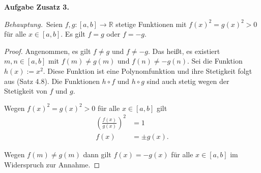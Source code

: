 \documentclass[12pt]{extarticle}
\newcommand{\beh}{\textit{Behauptung.}\ }
\newcommand{\aufgn}[1]{\textbf{Aufgabe #1.}}
\newcommand{\mg}[1]{\mathbb{#1}}
\begin{document}
\aufgn{Zusatz 3}

\beh Seien \(f, g \colon \left[a, b\right] \to \mg{R}\)
 stetige Funktionen mit \(f(x)^2=g(x)^2 > 0\) für alle
\(x \in \left[a, b\right]\).  Es gilt \(f = g\) oder \(f = -g\).

\begin{proof}
  Angenommen, es gilt \(f \ne g\) und \(f \ne -g\).  Das
  heißt, es existiert \(m, n \in \left[a, b\right]\) mit
  \(f(m) \ne g(m)\) und \(f(n) \ne -g(n)\).  Sei die
  Funktion \(h(x):=x^2\).  Diese Funktion ist eine
  Polynomfunktion und ihre Stetigkeit folgt aus (Satz
  4.8).  Die Funktionen \(h \circ f\) und \(h \circ g\)
  sind auch stetig wegen der Stetigkeit von \(f\) und \(g\).

Wegen  \(f(x)^2=g(x)^2 > 0\) für alle
\(x \in \left[a, b\right]\) gilt
\begin{align*}
  \left( \frac{f(x)}{g(x)} \right)^2 &= 1\\
  f(x) &= \pm g(x).
\end{align*}

Wegen \(f(m) \ne g(m)\) dann gilt \(f(x) = -g(x)\) für alle
\(x \in \left[a, b\right]\) im Widerspruch zur Annahme.
\end{proof}
\end{document}
